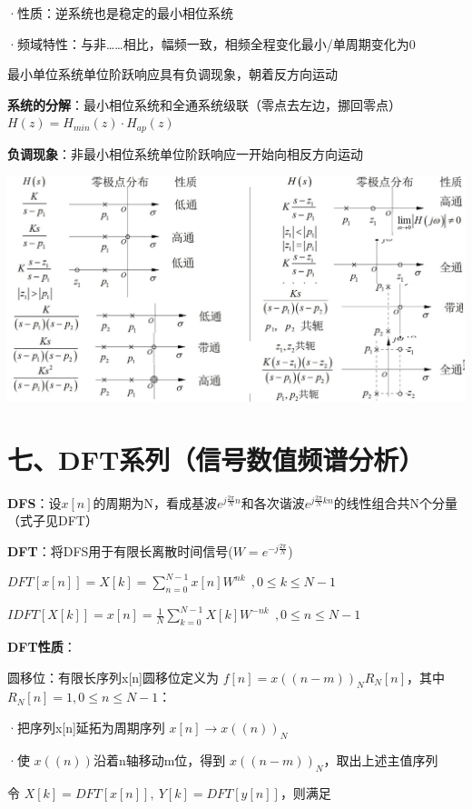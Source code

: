 ·性质：逆系统也是稳定的最小相位系统

·频域特性：与非……相比，幅频一致，相频全程变化最小/单周期变化为0

最小单位系统单位阶跃响应具有负调现象，朝着反方向运动

\textbf{系统的分解}：最小相位系统和全通系统级联（零点去左边，挪回零点）$H(z)\!=\!H_{min}(z)\cdot H_{ap}(z)$

\textbf{负调现象}：非最小相位系统单位阶跃响应一开始向相反方向运动

\begin{figurehere}
	\centering
	\includegraphics[width=1\linewidth]{image05}
	\label{fig:image05}
\end{figurehere}
\section*{七、DFT系列（信号数值频谱分析）}

\textbf{DFS}：设$x[n]$的周期为N，看成基波$e^{j\frac{2\pi}{N}n}$和各次谐波$e^{j\frac{2\pi}{N}kn}$的线性组合共N个分量（式子见DFT）

\textbf{DFT}：将DFS用于有限长离散时间信号($W\!=\!e^{-j\frac{2\pi}{N}}$)

$DFT[x[n]]={X}[k]=\sum^{N-1}_{n=0} {x}[n] W^{nk} \ \ ,0\leq k\leq N-1$

$IDFT[{X}[k]]\!=\!{x}[n]\!=\!\frac{1}{N}\sum^{N-1}_{k=0} {X}[k] W^{-nk} \ \ ,0\leq n\leq N-1$

\textbf{DFT性质}：

圆移位：有限长序列x[n]圆移位定义为 $f[n]=x((n-m))_NR_N[n]$，其中 $R_N[n]=1,0\leq n\leq N-1$：

·把序列x[n]延拓为周期序列 $x[n] \rightarrow x((n))_N$

·使 $x((n))$沿着n轴移动m位，得到 $x((n-m))_N$，取出上述主值序列

令 $X[k]=DFT[x[n]],\ Y[k]=DFT[y[n]]$，则满足

